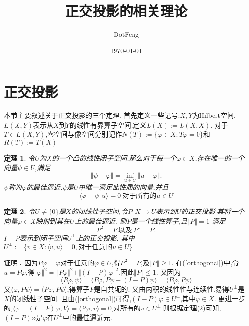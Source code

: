\documentclass[UTF8]{ctexart}
\title{正交投影的相关理论}
\author{DotFeng}
\date{\today}
\numberwithin{equation}{section}
\newtheorem{theorem}{\hspace{2em}定理}[section]
\begin{document}
\maketitle


\newpage

\tableofcontents

\newpage
\section{正交投影}
本节主要叙述关于正交投影的三个定理.
首先定义一些记号:$X,Y$为Hilbert空间,$L(X,Y)$表示从$X$到$Y$的线性有界算子空间.定义$L(X):=L(X,X)$.
对于$T\in L(X,Y)$,零空间与像空间分别记作$N(T):=\{ \varphi \in X:T\varphi =0\}$和$R(T):=T(X)$
\begin{theorem}
令$U$为$X$的一个凸的线性闭子空间.那么对于每一个$\varphi \in X$,存在唯一的一个向量$\psi \in U$,满足
\begin{equation}
\Vert \psi -\varphi \Vert =\inf_{u\in U}\Vert u-\varphi \Vert.
\end{equation}
$\psi$称为$\varphi$的最佳逼近.$\psi$是$U$中唯一满足此性质的向量,并且
\begin{equation}
\langle \varphi -\psi ,u\rangle =0\ \mbox{对于所有的} u\in U   \label{orthogonal}
\end{equation}
\end{theorem}

\begin{theorem} \label{orthogonal theorem}
令$U\ne \{ 0\}$是$X$的闭线性子空间,令$P:X\to U$表示到$U$的正交投影,其将一个向量$\varphi \in X$映射到其在$U$上的最佳逼近.
则$P$是一个线性算子,且$\Vert P\Vert =1$
满足
\begin{equation}
P^{2}=P \ \mbox{以及} \ P^{\star}=P.
\end{equation}
$I-P$表示到闭子空间$U^{\bot}$上的正交投影.
其中$U^{\bot}:=\{v\in X:\langle v,u\rangle =0,\mbox{对于任意的}u\in U\}$
\end{theorem}

证明：因为$P\varphi =\varphi$对于任意的$\varphi \in U$,得$P^{2}=P$,及$\Vert P\Vert \ge 1.$
在(\ref{orthogonal})中,令$u=P\varphi$,得$\Vert \varphi \Vert ^{2}=\Vert P\varphi \Vert ^{2}+\Vert (I-P)\varphi \Vert ^{2}.$因此$\Vert P\Vert \le 1.$
又因为
\begin{equation}
\langle P\varphi ,\psi \rangle =\langle P\varphi ,P\psi +(I-P)\psi \rangle =\langle P\varphi ,P\psi \rangle
\end{equation}
又$\langle \varphi ,P\psi \rangle =\langle P\varphi ,P\psi \rangle$,得算子$P$是自共轭的.
又由内积的线性性与连续性,易得$U^{\bot}$是$X$的闭线性子空间.
且由(\ref{orthogonal})可得,$(I-P)\varphi \in U^{\bot}$,其中$\varphi \in X.$
更进一步的,$\langle \varphi -(I-P)\varphi,V \rangle =\langle P\varphi ,v \rangle =0$,对所有的$v \in U^{\bot}.$则根据定理(\ref{orthogonal theorem})可知,$(I-P)\varphi$是$\varphi$在$U^{\bot}$中的最佳逼近元.
\end{document}
